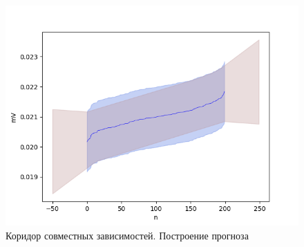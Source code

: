 \begin{figure}[ht]
	\begin{center}
		\includegraphics[scale = 0.55]{../images/corridor_of_joint_dependencies_prediction.png}
	\end{center}
	\caption{Коридор совместных зависимостей. Построение прогноза}
\end{figure}


\newpage
